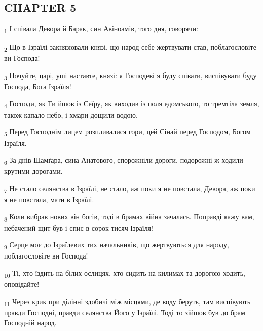 \subsection{CHAPTER 5}
\begin{tcolorbox}
\textsubscript{1} І співала Девора й Барак, син Авіноамів, того дня, говорячи:
\end{tcolorbox}
\begin{tcolorbox}
\textsubscript{2} Що в Ізраїлі закнязювали князі, що народ себе жертвувати став, поблагословіте ви Господа!
\end{tcolorbox}
\begin{tcolorbox}
\textsubscript{3} Почуйте, царі, уші наставте, князі: я Господеві я буду співати, виспівувати буду Господа, Бога Ізраїля!
\end{tcolorbox}
\begin{tcolorbox}
\textsubscript{4} Господи, як Ти йшов із Сеїру, як виходив із поля едомського, то тремтіла земля, також капало небо, і хмари дощили водою.
\end{tcolorbox}
\begin{tcolorbox}
\textsubscript{5} Перед Господнім лицем розпливалися гори, цей Сінай перед Господом, Богом Ізраїля.
\end{tcolorbox}
\begin{tcolorbox}
\textsubscript{6} За днів Шамґара, сина Анатового, спорожніли дороги, подорожні ж ходили крутими дорогами.
\end{tcolorbox}
\begin{tcolorbox}
\textsubscript{7} Не стало селянства в Ізраїлі, не стало, аж поки я не повстала, Девора, аж поки я не повстала, мати в Ізраїлі.
\end{tcolorbox}
\begin{tcolorbox}
\textsubscript{8} Коли вибрав нових він богів, тоді в брамах війна зачалась. Поправді кажу вам, небачений щит був і спис в сорок тисяч Ізраїля!
\end{tcolorbox}
\begin{tcolorbox}
\textsubscript{9} Серце моє до Ізраїлевих тих начальників, що жертвуються для народу, поблагословіте ви Господа!
\end{tcolorbox}
\begin{tcolorbox}
\textsubscript{10} Ті, хто їздить на білих ослицях, хто сидить на килимах та дорогою ходить, оповідайте!
\end{tcolorbox}
\begin{tcolorbox}
\textsubscript{11} Через крик при ділінні здобичі між місцями, де воду беруть, там виспівують правди Господні, правди селянства Його у Ізраїлі. Тоді то зійшов був до брам Господній народ.
\end{tcolorbox}

